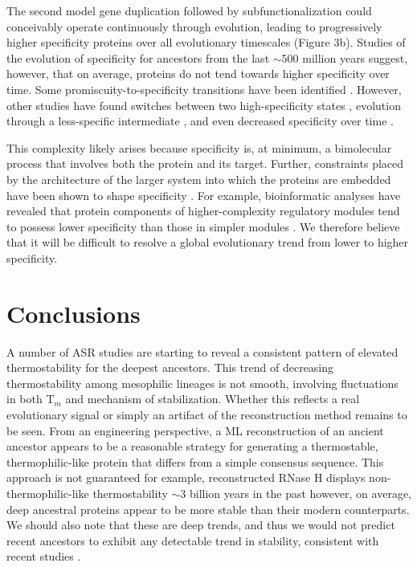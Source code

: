 The second model \textemdash{} gene duplication followed by subfunctionalization
\textemdash{} could conceivably operate continuously through evolution,
leading to progressively higher specificity proteins over all evolutionary
timescales (Figure 3b). Studies of the evolution of specificity for
ancestors from the last $\sim$500 million years suggest, however,
that on average, proteins do not tend towards higher specificity over
time. Some promiscuity-to-specificity transitions have been identified
\cite{risso_hyperstability_2013,eick_evolution_2012,boucher_atomic-resolution_2014,wouters_despecialization_2003,wilson_using_2015}.
However, other studies have found switches between two high-specificity
states \cite{mckeown_evolution_2014,clifton_ancestral_2016}, evolution
through a less-specific intermediate \cite{sayou_promiscuous_2014,aakre_evolving_2015,howard_ancestral_2014},
and even decreased specificity over time \cite{chinen_evolution_2000}.

This complexity likely arises because specificity is, at minimum,
a bimolecular process that involves both the protein and its target.
Further, constraints placed by the architecture of the larger system
into which the proteins are embedded have been shown to shape specificity
\cite{howard_ancestral_2014,chinen_evolution_2000,peleg_evolution_2014,kim_inhibitory_2012,hong_molecular_2014,vos_breaking_2015,ernst_coevolution_2010,stiffler_pdz_2007}.
For example, bioinformatic analyses have revealed that protein components
of higher-complexity regulatory modules tend to possess lower specificity
than those in simpler modules \cite{stewart_evolution_2013}. We therefore
believe that it will be difficult to resolve a global evolutionary
trend from lower to higher specificity.

\section{Conclusions}

A number of ASR studies are starting to reveal a consistent pattern
of elevated thermostability for the deepest ancestors. This trend
of decreasing thermostability among mesophilic lineages is not smooth,
involving fluctuations in both T$_{m}$ and mechanism of stabilization.
Whether this reflects a real evolutionary signal or simply an artifact
of the reconstruction method remains to be seen. From an engineering
perspective, a ML reconstruction of an ancient ancestor appears to
be a reasonable strategy for generating a thermostable, thermophilic-like
protein that differs from a simple consensus sequence. This approach
is not guaranteed \textemdash{} for example, reconstructed RNase H
displays non-thermophilic-like thermostability $\sim$3 billion years
in the past \textemdash{} however, on average, deep ancestral proteins
appear to be more stable than their modern counterparts. We should
also note that these are deep trends, and thus we would not predict
recent ancestors to exhibit any detectable trend in stability, consistent
with recent studies \cite{hobbs_origin_2012,loughran_stability_2014,dasmeh_positively_2013}.

